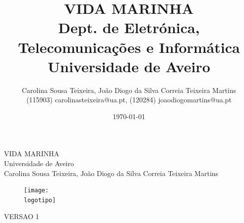 \documentclass{report}
\begin{document}
%
\def\titulo{VIDA MARINHA}
\def\data{DATA}
\def\autores{Carolina Sousa Teixeira, João Diogo da Silva Correia Teixeira Martins}
\def\autorescontactos{(115903) carolinasteixeira@ua.pt, (120284) joaodiogomartins@ua.pt}
\def\versao{VERSAO 1}
\def\departamento{Dept. de Eletrónica, Telecomunicações e Informática}
\def\empresa{Universidade de Aveiro}
\def\logotipo{ua.pdf}
%
%
\begin{titlepage}

\begin{center}
%
\vspace*{50mm}
%
{\Huge \titulo}\\ 
%
\vspace{10mm}
%
{\Large \empresa}\\
%
\vspace{10mm}
%
{\LARGE \autores}\\ 
%
\vspace{30mm}
%
\begin{figure}[h]
\center
\texttt{[image: \\logotipo]}
\end{figure}
%
\vspace{30mm}
\end{center}
%
\begin{flushright}
\versao
\end{flushright}
\end{titlepage}

\title{%
{\Huge\textbf{\titulo}}\\
{\Large \departamento\\ \empresa}
}
%
\author{%
    \autores \\
    \autorescontactos
}
%
\date{\today}
%
\maketitle

\end{document}
